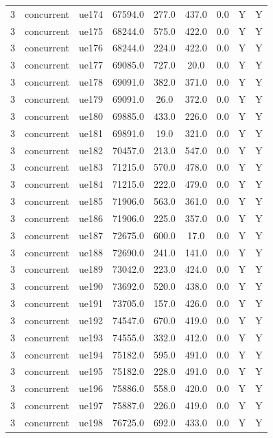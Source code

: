 \begin{table}[ht]
\begin{tabular}{|c|c|c|c|c|c|c|c|c|}
3 & concurrent & ue174 & 67594.0 & 277.0 & 437.0 & 0.0 & Y & Y \\
3 & concurrent & ue175 & 68244.0 & 575.0 & 422.0 & 0.0 & Y & Y \\
3 & concurrent & ue176 & 68244.0 & 224.0 & 422.0 & 0.0 & Y & Y \\
3 & concurrent & ue177 & 69085.0 & 727.0 & 20.0 & 0.0 & Y & Y \\
3 & concurrent & ue178 & 69091.0 & 382.0 & 371.0 & 0.0 & Y & Y \\
3 & concurrent & ue179 & 69091.0 & 26.0 & 372.0 & 0.0 & Y & Y \\
3 & concurrent & ue180 & 69885.0 & 433.0 & 226.0 & 0.0 & Y & Y \\
3 & concurrent & ue181 & 69891.0 & 19.0 & 321.0 & 0.0 & Y & Y \\
3 & concurrent & ue182 & 70457.0 & 213.0 & 547.0 & 0.0 & Y & Y \\
3 & concurrent & ue183 & 71215.0 & 570.0 & 478.0 & 0.0 & Y & Y \\
3 & concurrent & ue184 & 71215.0 & 222.0 & 479.0 & 0.0 & Y & Y \\
3 & concurrent & ue185 & 71906.0 & 563.0 & 361.0 & 0.0 & Y & Y \\
3 & concurrent & ue186 & 71906.0 & 225.0 & 357.0 & 0.0 & Y & Y \\
3 & concurrent & ue187 & 72675.0 & 600.0 & 17.0 & 0.0 & Y & Y \\
3 & concurrent & ue188 & 72690.0 & 241.0 & 141.0 & 0.0 & Y & Y \\
3 & concurrent & ue189 & 73042.0 & 223.0 & 424.0 & 0.0 & Y & Y \\
3 & concurrent & ue190 & 73692.0 & 520.0 & 438.0 & 0.0 & Y & Y \\
3 & concurrent & ue191 & 73705.0 & 157.0 & 426.0 & 0.0 & Y & Y \\
3 & concurrent & ue192 & 74547.0 & 670.0 & 419.0 & 0.0 & Y & Y \\
3 & concurrent & ue193 & 74555.0 & 332.0 & 412.0 & 0.0 & Y & Y \\
3 & concurrent & ue194 & 75182.0 & 595.0 & 491.0 & 0.0 & Y & Y \\
3 & concurrent & ue195 & 75182.0 & 228.0 & 491.0 & 0.0 & Y & Y \\
3 & concurrent & ue196 & 75886.0 & 558.0 & 420.0 & 0.0 & Y & Y \\
3 & concurrent & ue197 & 75887.0 & 226.0 & 419.0 & 0.0 & Y & Y \\
3 & concurrent & ue198 & 76725.0 & 692.0 & 433.0 & 0.0 & Y & Y \\

\end{tabular}
\end{table}
